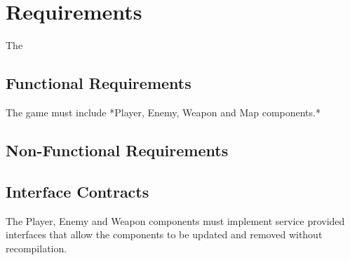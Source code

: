 \section{Requirements}
The 

\subsection{Functional Requirements}
The game must include *Player, Enemy, Weapon and Map components.*

\subsection{Non-Functional Requirements}


\subsection{Interface Contracts}
The Player, Enemy and Weapon components must implement service provided 
interfaces that allow the components to be updated and removed without 
recompilation.